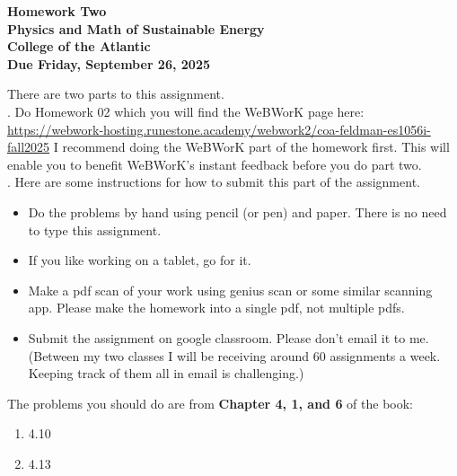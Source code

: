 \documentclass[12pt]{article}
\begin{document}
\pagestyle{empty}
 
\begin{center}
{\LARGE {\bf Homework Two}}\\
\bigskip
{\Large {\bf Physics and Math of Sustainable Energy}}\\
\bigskip
{\Large {\bf College of the Atlantic}}\\
\bigskip
{ {\bf Due Friday, September 26, 2025}}\\ 
\end{center}
\medskip


\noindent There are two parts to this assignment.\\

.  Do Homework 02 which you
will find the WeBWorK page here: \url{https://webwork-hosting.runestone.academy/webwork2/coa-feldman-es1056i-fall2025}
I recommend doing the WeBWorK part of the homework first.  This will
enable you to benefit WeBWorK's instant feedback before you do part
two.\\ 


.  Here are some
instructions for how to submit this part of the assignment.
\begin{itemize}
\item Do the problems by hand using pencil (or pen) and paper.
  There is no need to type this assignment.
\item If you like working on a tablet, go for it. 
\item Make a pdf scan of your work using genius scan or some
  similar scanning app.  Please make the homework into a single
  pdf, not multiple pdfs.
\item Submit the assignment on google classroom.  Please don't
  email it to me.  (Between my two classes I will be receiving
  around 60 assignments a week.  Keeping track of them all in email 
  is challenging.)\\
\end{itemize}

\noindent The problems you should do are from {\bf Chapter 4, 1, and
  6} of the book: \\

\begin{enumerate}
\setlength{\itemsep}{-1mm}
\item 4.10
\item 4.13\\
\end{enumerate}
\end{document}
